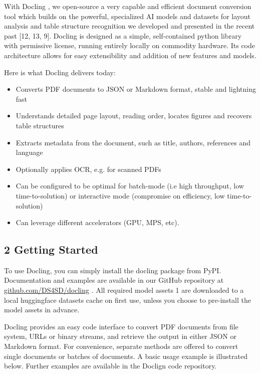 With Docling , we open-source a very capable and efficient document conversion tool which builds on the powerful, specialized AI models and datasets for layout analysis and table structure recognition we developed and presented in the recent past [12, 13, 9]. Docling is designed as a simple, self-contained python library with permissive license, running entirely locally on commodity hardware. Its code architecture allows for easy extensibility and addition of new features and models.

Here is what Docling delivers today:

\begin{itemize}
\item Converts PDF documents to JSON or Markdown format, stable and lightning fast
\item Understands detailed page layout, reading order, locates figures and recovers table structures
\item Extracts metadata from the document, such as title, authors, references and language
\item Optionally applies OCR, e.g. for scanned PDFs
\item Can be configured to be optimal for batch-mode (i.e high throughput, low time-to-solution) or interactive mode (compromise on efficiency, low time-to-solution)
\item Can leverage different accelerators (GPU, MPS, etc).
\end{itemize}

\subsection{2 Getting Started}

To use Docling, you can simply install the docling package from PyPI. Documentation and examples are available in our GitHub repository at  \href{https://github.com/DS4SD/docling}{github.com/DS4SD/docling} . All required model assets 1 are downloaded to a local huggingface datasets cache on first use, unless you choose to pre-install the model assets in advance.

Docling provides an easy code interface to convert PDF documents from file system, URLs or binary streams, and retrieve the output in either JSON or Markdown format. For convenience, separate methods are offered to convert single documents or batches of documents. A basic usage example is illustrated below. Further examples are available in the Doclign code repository.

